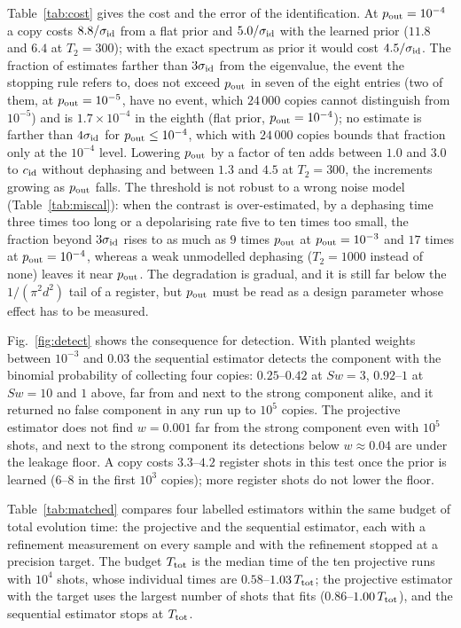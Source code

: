 \documentclass[journal]{IEEEtran}
\begin{document}
Table~\ref{tab:cost} gives the cost and the error of the identification. At $p_{\rm out}=10^{-4}$ a copy costs $8.8/\sigma_{\rm id}$ from a flat prior and $5.0/\sigma_{\rm id}$ with the learned prior ($11.8$ and $6.4$ at $T_2=300$); with the exact spectrum as prior it would cost $4.5/\sigma_{\rm id}$. The fraction of estimates farther than $3\sigma_{\rm id}$ from the eigenvalue, the event the stopping rule refers to, does not exceed $p_{\rm out}$ in seven of the eight entries (two of them, at $p_{\rm out}=10^{-5}$, have no event, which $24\,000$ copies cannot distinguish from $10^{-5}$) and is $1.7\times10^{-4}$ in the eighth (flat prior, $p_{\rm out}=10^{-4}$); no estimate is farther than $4\sigma_{\rm id}$ for $p_{\rm out}\le10^{-4}$, which with $24\,000$ copies bounds that fraction only at the $10^{-4}$ level. Lowering $p_{\rm out}$ by a factor of ten adds between $1.0$ and $3.0$ to $c_{\rm id}$ without dephasing and between $1.3$ and $4.5$ at $T_2=300$, the increments growing as $p_{\rm out}$ falls. The threshold is not robust to a wrong noise model (Table~\ref{tab:miscal}): when the contrast is over-estimated, by a dephasing time three times too long or a depolarising rate five to ten times too small, the fraction beyond $3\sigma_{\rm id}$ rises to as much as $9$ times $p_{\rm out}$ at $p_{\rm out}=10^{-3}$ and $17$ times at $p_{\rm out}=10^{-4}$, whereas a weak unmodelled dephasing ($T_2=1000$ instead of none) leaves it near $p_{\rm out}$. The degradation is gradual, and it is still far below the $1/(\pi^2d^2)$ tail of a register, but $p_{\rm out}$ must be read as a design parameter whose effect has to be measured.

Fig.~\ref{fig:detect} shows the consequence for detection. With planted weights between $10^{-3}$ and $0.03$ the sequential estimator detects the component with the binomial probability of collecting four copies: $0.25$--$0.42$ at $Sw=3$, $0.92$--$1$ at $Sw=10$ and $1$ above, far from and next to the strong component alike, and it returned no false component in any run up to $10^5$ copies. The projective estimator does not find $w=0.001$ far from the strong component even with $10^5$ shots, and next to the strong component its detections below $w\approx0.04$ are under the leakage floor. A copy costs $3.3$--$4.2$ register shots in this test once the prior is learned ($6$--$8$ in the first $10^3$ copies); more register shots do not lower the floor.

Table~\ref{tab:matched} compares four labelled estimators within the same budget of total evolution time: the projective and the sequential estimator, each with a refinement measurement on every sample and with the refinement stopped at a precision target. The budget $T_{\rm tot}$ is the median time of the ten projective runs with $10^4$ shots, whose individual times are $0.58$--$1.03\,T_{\rm tot}$; the projective estimator with the target uses the largest number of shots that fits ($0.86$--$1.00\,T_{\rm tot}$), and the sequential estimator stops at $T_{\rm tot}$.
\end{document}
